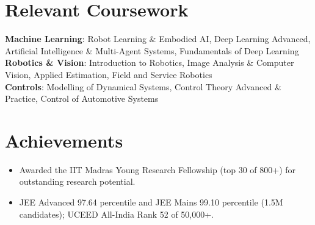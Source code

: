 \documentclass[letterpaper, 11pt]{article}
\begin{document}
\section{Relevant Coursework}

\textbf{Machine Learning}: Robot Learning \& Embodied AI, Deep Learning Advanced, Artificial Intelligence \& Multi-Agent Systems, Fundamentals of Deep Learning \\
\textbf{Robotics \& Vision}: Introduction to Robotics, Image Analysis \& Computer Vision, Applied Estimation, Field and Service Robotics \\
\textbf{Controls}: Modelling of Dynamical Systems, Control Theory Advanced \& Practice, Control of Automotive Systems \\

\section{Achievements}
\begin{itemize}[leftmargin=0.15in]
    \setlength{\itemsep}{-0.3em}
    \item Awarded the IIT Madras Young Research Fellowship (top 30 of 800+) for outstanding research potential.
    \item JEE Advanced 97.64 percentile and JEE Mains 99.10 percentile (1.5M candidates); UCEED All-India Rank 52 of 50,000+.
\end{itemize}
\end{document}

